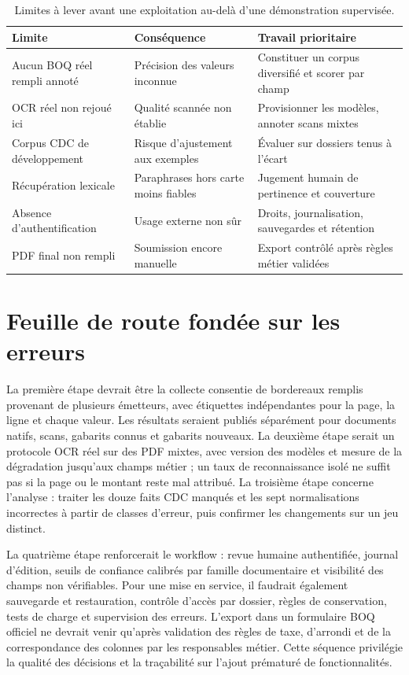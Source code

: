 \begin{table}[htbp]\centering\tighttable
\begin{tabularx}{\textwidth}{@{}p{34mm}Y Y@{}}\toprule
Limite & Conséquence & Travail prioritaire\\\midrule
Aucun BOQ réel rempli annoté & Précision des valeurs inconnue & Constituer un corpus diversifié et scorer par champ\\
OCR réel non rejoué ici & Qualité scannée non établie & Provisionner les modèles, annoter scans mixtes\\
Corpus CDC de développement & Risque d'ajustement aux exemples & Évaluer sur dossiers tenus à l'écart\\
Récupération lexicale & Paraphrases hors carte moins fiables & Jugement humain de pertinence et couverture\\
Absence d'authentification & Usage externe non sûr & Droits, journalisation, sauvegardes et rétention\\
PDF final non rempli & Soumission encore manuelle & Export contrôlé après règles métier validées\\\bottomrule
\end{tabularx}
\caption{Limites à lever avant une exploitation au-delà d'une démonstration supervisée.}\label{tab:limites}
\end{table}

\section{Feuille de route fondée sur les erreurs}
La première étape devrait être la collecte consentie de bordereaux remplis provenant de plusieurs émetteurs, avec étiquettes indépendantes pour la page, la ligne et chaque valeur. Les résultats seraient publiés séparément pour documents natifs, scans, gabarits connus et gabarits nouveaux. La deuxième étape serait un protocole OCR réel sur des PDF mixtes, avec version des modèles et mesure de la dégradation jusqu'aux champs métier ; un taux de reconnaissance isolé ne suffit pas si la page ou le montant reste mal attribué. La troisième étape concerne l'analyse : traiter les douze faits CDC manqués et les sept normalisations incorrectes à partir de classes d'erreur, puis confirmer les changements sur un jeu distinct.

La quatrième étape renforcerait le workflow : revue humaine authentifiée, journal d'édition, seuils de confiance calibrés par famille documentaire et visibilité des champs non vérifiables. Pour une mise en service, il faudrait également sauvegarde et restauration, contrôle d'accès par dossier, règles de conservation, tests de charge et supervision des erreurs. L'export dans un formulaire BOQ officiel ne devrait venir qu'après validation des règles de taxe, d'arrondi et de la correspondance des colonnes par les responsables métier. Cette séquence privilégie la qualité des décisions et la traçabilité sur l'ajout prématuré de fonctionnalités.
